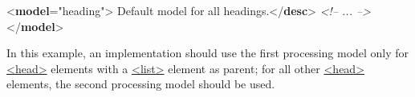 \begin{shaded}
{<\textbf{model}\hspace*{1em}{behaviour}="{heading}">}\mbox{}\newline 
{}Default model for all headings.{</\textbf{desc}>}\mbox{}\newline 
\textit{<!-- ... -->}\mbox{}\newline 
{</\textbf{model}>}\end{shaded}\egroup\par \noindent  In this example, an implementation should use the first processing model only for \hyperref[TEI.head]{<head>} elements with a \hyperref[TEI.list]{<list>} element as parent; for all other \hyperref[TEI.head]{<head>} elements, the second processing model should be used.

